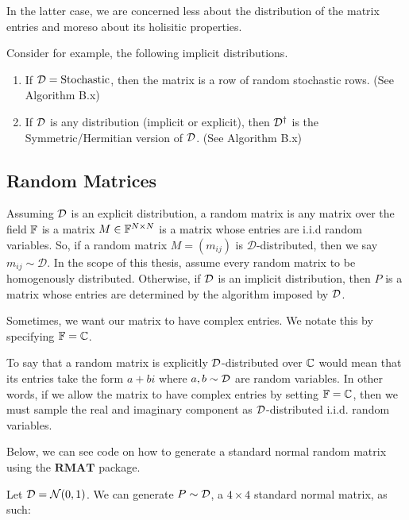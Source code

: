 In the latter case, we are concerned less about the distribution of the matrix entries and moreso about its holisitic properties.

Consider for example, the following implicit distributions.

\begin{enumerate}
\item If $\mathcal{D} = \text{Stochastic}$, then the matrix is a row of random stochastic rows. (See Algorithm B.x)
\item If $\mathcal{D}$ is any distribution (implicit or explicit), then $\mathcal{D}^{\dagger}$ is the Symmetric/Hermitian version of $\mathcal{D}$. (See Algorithm B.x)
\end{enumerate}

\subsection{Random Matrices}

\begin{definition}
Assuming $\mathcal{D}$ is an explicit distribution, a random matrix is any matrix over the field $\mathbb{F}$ is a matrix $M \in \mathbb{F}^{N \times N}$ is a matrix whose entries are i.i.d random variables. So, if a random matrix $M = (m_{ij})$ is $\mathcal{D}$-distributed, then we say $m_{ij} \sim \mathcal{D}$. In the scope of this thesis, assume every random matrix to be homogenously distributed. Otherwise, if $\mathcal{D}$ is an implicit distribution, then $P$ is a matrix whose entries are determined by the algorithm imposed by $\mathcal{D}$.
\end{definition}

Sometimes, we want our matrix to have complex entries. We notate this by specifying $\mathbb{F} = \mathbb{C}$.

\begin{remark}
To say that a random matrix is explicitly $\mathcal{D}$-distributed over $\mathbb{C}$ would mean that its entries take the form $a + bi$ where $a,b \sim \mathcal{D}$ are random variables. In other words, if we allow the matrix to have complex entries by setting $\mathbb{F} = \mathbb{C}$, then we must sample the real and imaginary component as $\mathcal{D}$-distributed i.i.d. random variables.
\end{remark}

Below, we can see code on how to generate a standard normal random matrix using the $\textbf{RMAT}$ package.

\begin{code}
Let $\mathcal{D} = \mathcal{N}(0,1)$. We can generate $P \sim \mathcal{D}$, a $4 \times 4$ standard normal matrix, as such:
\end{code}

